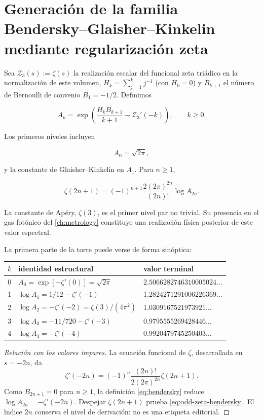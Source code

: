 \section{Generación de la familia Bendersky--Glaisher--Kinkelin mediante regularización zeta}

Sea \(\mathcal Z_3(s):=\zeta(s)\) la realizaci\'on escalar del funcional
zeta tri\'adico en la normalizaci\'on de este volumen,
\(H_k=\sum_{j=1}^k j^{-1}\) (con \(H_0=0\)) y \(B_{k+1}\) el n\'umero de
Bernoulli de convenio \(B_1=-1/2\). Definimos

\begin{equation}
A_k=\exp\!\left(
\frac{H_kB_{k+1}}{k+1}-\mathcal Z_3'(-k)
\right),\qquad k\ge0.
\label{eq:bendersky}
\end{equation}

Los primeros niveles incluyen

\[
A_0=\sqrt{2\pi},
\]

y la constante de Glaisher--Kinkelin en \(A_1\). Para \(n\ge1\),

\begin{equation}
\zeta(2n+1)=(-1)^{n+1}
\frac{2(2\pi)^{2n}}{(2n)!}\log A_{2n}.
\label{eq:odd-zeta-bendersky}
\end{equation}

La constante de Ap\'ery, \(\zeta(3)\), es el primer nivel par no trivial.
Su presencia en el gas fot\'onico del \cref{ch:metrology} constituye una
realizaci\'on f\'isica posterior de este valor espectral.

La primera parte de la torre puede verse de forma sinóptica:
\begin{center}
\small
\begin{tabular}{@{}cll@{}}
\toprule
\(k\) & identidad estructural & valor terminal\\
\midrule
0 & \(A_0=\exp[-\zeta'(0)]=\sqrt{2\pi}\)
  & \(2.5066282746310005024\ldots\)\\
1 & \(\log A_1=1/12-\zeta'(-1)\)
  & \(1.2824271291006226369\ldots\)\\
2 & \(\log A_2=-\zeta'(-2)=\zeta(3)/(4\pi^2)\)
  & \(1.0309167521973921\ldots\)\\
3 & \(\log A_3=-11/720-\zeta'(-3)\)
  & \(0.9795555269428446\ldots\)\\
4 & \(\log A_4=-\zeta'(-4)\)
  & \(0.9920479745250403\ldots\)\\
\bottomrule
\end{tabular}
\end{center}

\begin{proof}[Relaci\'on con los valores impares]
La ecuaci\'on funcional de \(\zeta\), desarrollada en \(s=-2n\), da
\begin{equation}
\zeta'(-2n)=(-1)^n
\frac{(2n)!}{2(2\pi)^{2n}}\zeta(2n+1).
\label{eq:zeta-derivative-even-negative}
\end{equation}
Como \(B_{2n+1}=0\) para \(n\ge1\), la definici\'on
\cref{eq:bendersky} reduce \(\log A_{2n}=-\zeta'(-2n)\). Despejar
\(\zeta(2n+1)\) prueba \cref{eq:odd-zeta-bendersky}. El \`indice \(2n\)
conserva el nivel de derivaci\'on: no es una etiqueta editorial.
\end{proof}


